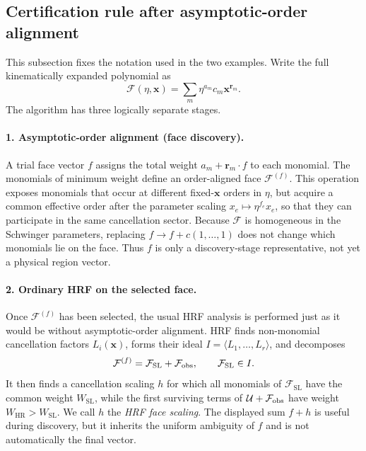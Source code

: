 \documentclass[11pt]{article}
\newcommand{\F}{\mathcal F}
\newcommand{\U}{\mathcal U}
\newcommand{\SL}{\mathrm{SL}}
\newcommand{\HR}{\mathrm{HR}}
\begin{document}
\subsection{Certification rule after asymptotic-order alignment}

This subsection fixes the notation used in the two examples.  Write the full
kinematically expanded polynomial as
\begin{equation}
 \F(\eta,\mathbf x)=\sum_m \eta^{a_m}c_m\mathbf x^{\mathbf r_m}.
 \label{eq:full-laurent-F}
\end{equation}
The algorithm has three logically separate stages.

\paragraph{1. Asymptotic-order alignment (face discovery).}
A trial face vector \(f\) assigns the total weight
\(a_m+\mathbf r_m\mathbin{\cdot}f\) to each monomial.  The monomials of
minimum weight define an order-aligned face \(\F^{(f)}\).  This operation
exposes monomials that occur at different fixed-\(\mathbf x\) orders in
\(\eta\), but acquire a common effective order after the parameter scaling
\(x_e\mapsto\eta^{f_e}x_e\), so that they can participate in the same
cancellation sector.  Because \(\F\) is
homogeneous in the Schwinger parameters, replacing
\(f\to f+c(1,\ldots,1)\) does not change which monomials lie on the face.
Thus \(f\) is only a discovery-stage representative, not yet a physical
region vector.

\paragraph{2. Ordinary HRF on the selected face.}
Once \(\F^{(f)}\) has been selected, the usual HRF analysis is performed just
as it would be without asymptotic-order alignment.  HRF finds non-monomial cancellation
factors \(L_i(\mathbf x)\), forms their ideal
\(I=\langle L_1,\ldots,L_r\rangle\), and decomposes
\begin{equation}
 \F^{(f)}=\F_{\SL}+\F_{\rm obs},\qquad \F_{\SL}\in I.
 \label{eq:hrf-decomposition}
\end{equation}
It then finds a cancellation scaling \(h\) for which all monomials of
\(\F_{\SL}\) have the common weight \(W_{\SL}\), while the first surviving
terms of \(\U+\F_{\rm obs}\) have weight \(W_{\HR}>W_{\SL}\).  We call \(h\)
the \emph{HRF face scaling}.  The displayed sum \(f+h\) is useful during
discovery, but it inherits the uniform ambiguity of \(f\) and is not
automatically the final vector.
\end{document}
